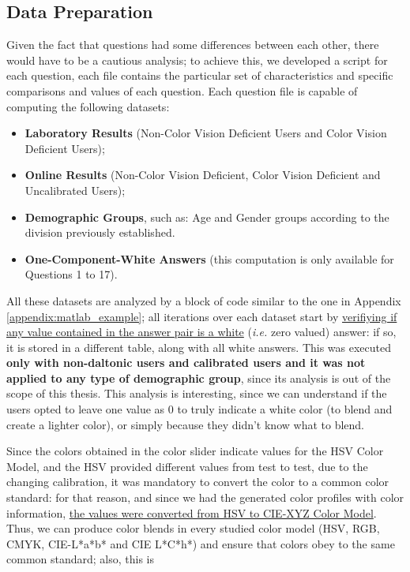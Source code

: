 \subsection{Data Preparation}
\label{subsec:results_preparation}
%
Given the fact that questions had some differences between each other, there would have to be a cautious analysis; to achieve this, we developed a script for each question, each
file contains the particular set of characteristics and specific comparisons and values of each question. Each question file is capable of computing the following datasets:
%
\begin{itemize}[noitemsep]
  \item \textbf{Laboratory Results} (Non-Color Vision Deficient Users and Color Vision Deficient Users);
  \item \textbf{Online Results} (Non-Color Vision Deficient, Color Vision Deficient and Uncalibrated Users);
  \item \textbf{Demographic Groups}, such as: Age and Gender groups according to the division previously established.
  \item \textbf{One-Component-White Answers} (this computation is only available for Questions 1 to 17).
\end{itemize} \par
%
All these datasets are analyzed by a block of code similar to the one in Appendix \ref{appendix:matlab_example}; all iterations over each dataset start by \ul{verifiying if any value contained in
the answer pair is a white} (\emph{i.e.} zero valued) answer: if so, it is stored in a different table, along with all white answers. This was executed \textbf{only
with non-daltonic users and calibrated users and it was not applied to any type of demographic group}, since its analysis is out of the scope of this thesis. This analysis is
interesting, since we can understand if the users opted to leave one value as 0 to truly indicate a white color (to blend and create a lighter color), or simply because they
didn't know what to blend. \par
%
Since the colors obtained in the color slider indicate values for the HSV Color Model, and the HSV provided different values from test to test, due to the changing calibration, it was mandatory to
convert the color to a common color standard: for that reason, and since we had the generated color profiles with color information, \ul{the values were converted from HSV to CIE-XYZ Color Model}.
Thus, we can produce color blends in every studied color model (HSV, RGB, CMYK, CIE-L*a*b* and CIE L*C*h*) and ensure that colors obey to the same common standard; also, this is

